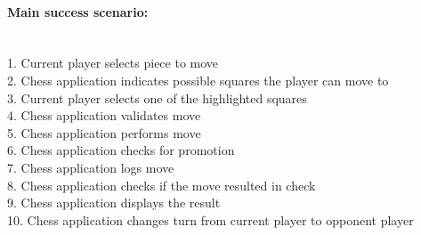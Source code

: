 \documentclass{article}
\begin{document}
\paragraph{Main success scenario:}\mbox{}\\
1. Current player selects piece to move\\
2. Chess application indicates possible squares the player can move to\\
3. Current player selects one of the highlighted squares\\
4. Chess application validates move\\
5. Chess application performs move\\
6. Chess application checks for promotion\\
7. Chess application logs move\\
8. Chess application checks if the move resulted in check\\
9. Chess application displays the result\\
10. Chess application changes turn from current player to opponent player
\end{document}
